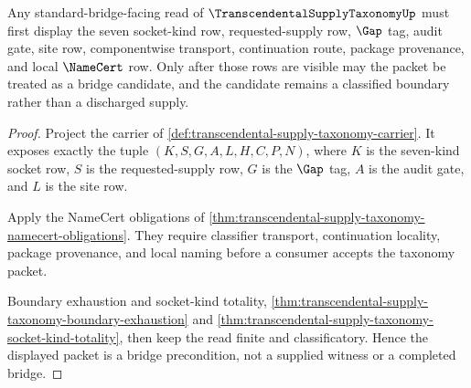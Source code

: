 \begin{theorem}
\label{thm:transcendental-supply-taxonomy-bridge-precondition}
Any standard-bridge-facing read of $\TranscendentalSupplyTaxonomyUp$ must first display the seven socket-kind row, requested-supply row, $\Gap$ tag, audit gate, site row, componentwise transport, continuation route, package provenance, and local $\NameCert$ row. Only after those rows are visible may the packet be treated as a bridge candidate, and the candidate remains a classified boundary rather than a discharged supply.
\end{theorem}
\begin{proof}
Project the carrier of \autoref{def:transcendental-supply-taxonomy-carrier}. It exposes exactly the tuple $(K,S,G,A,L,H,C,P,N)$, where $K$ is the seven-kind socket row, $S$ is the requested-supply row, $G$ is the $\Gap$ tag, $A$ is the audit gate, and $L$ is the site row.

Apply the NameCert obligations of \autoref{thm:transcendental-supply-taxonomy-namecert-obligations}. They require classifier transport, continuation locality, package provenance, and local naming before a consumer accepts the taxonomy packet.

Boundary exhaustion and socket-kind totality, \autoref{thm:transcendental-supply-taxonomy-boundary-exhaustion} and \autoref{thm:transcendental-supply-taxonomy-socket-kind-totality}, then keep the read finite and classificatory. Hence the displayed packet is a bridge precondition, not a supplied witness or a completed bridge.
\end{proof}

